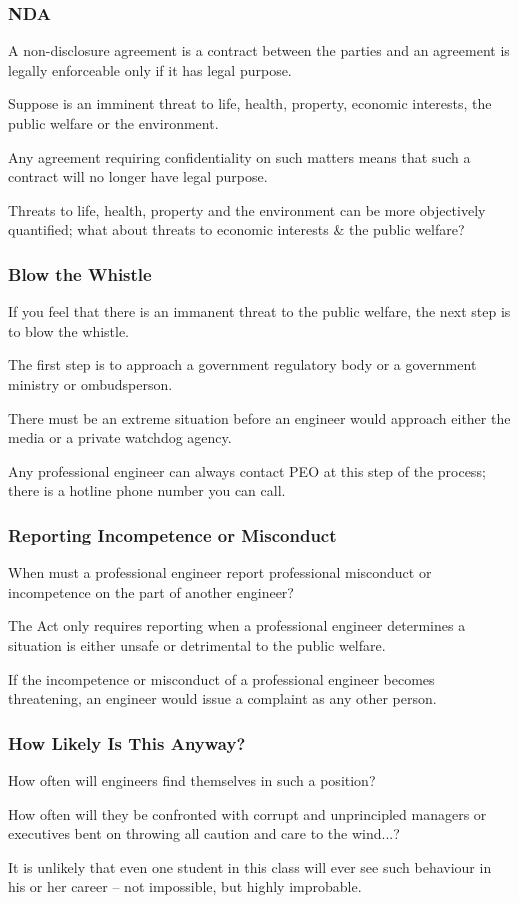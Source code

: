 \begin{frame}
\frametitle{NDA}

A non-disclosure agreement is a contract between the parties and an agreement is legally enforceable only if it has legal purpose.

Suppose is an imminent threat to life, health, property, economic interests, the public welfare or the environment.

Any agreement requiring confidentiality on such matters means that such a contract will no longer have legal purpose.

Threats to life, health, property and the environment can be more objectively quantified; what about threats to economic interests \& the public welfare?


\end{frame}



\begin{frame}
\frametitle{Blow the Whistle}

If you feel that there is an immanent threat to the public welfare, the next step is to blow the whistle.

The first step is to approach a government regulatory body or a government ministry or ombudsperson.

There must be an extreme situation before an engineer would approach either the media or a private watchdog agency.

Any professional engineer can always contact PEO at this step of the process; there is a hotline phone number you can call.


\end{frame}



\begin{frame}
\frametitle{Reporting Incompetence or Misconduct}

When must a professional engineer report professional misconduct or incompetence on the part of another engineer?

The Act only requires reporting when a professional engineer determines a situation is either unsafe or detrimental to the public welfare.

If the incompetence or misconduct of a professional engineer becomes threatening, an engineer would issue a complaint as any other person.


\end{frame}



\begin{frame}
\frametitle{How Likely Is This Anyway?}

How often will engineers find themselves in such a position?

How often will they be confronted with corrupt and unprincipled managers or executives bent on throwing all caution and care to the wind...?


It is unlikely that even one student in this class will ever see such behaviour in his or her career -- not impossible, but highly improbable.

\end{frame}



